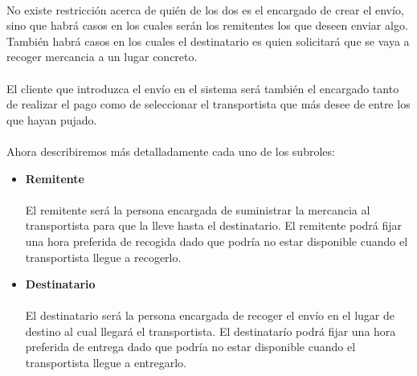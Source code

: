 \documentclass[10pt, a4paper,spanish]{article}
\begin{document}
\begin{itemize}
			\paragraph{}
			No existe restricción acerca de quién de los dos es el encargado de crear el envío, sino que habrá casos en los cuales serán los remitentes los que deseen enviar algo. También habrá casos en los cuales el destinatario es quien solicitará que se vaya a recoger mercancia a un lugar concreto.

			\paragraph{}
			El cliente que introduzca el envío en el sistema será también el encargado tanto de realizar el pago como de seleccionar el transportista que más desee de entre los que hayan pujado.

			\paragraph{}
			Ahora describiremos más detalladamente cada uno de los subroles:

			\begin{itemize}

				\item{\textbf{Remitente}}
				\paragraph{}
				El remitente será la persona encargada de suministrar la mercancia al transportista para que la lleve hasta el destinatario. El remitente podrá fijar una hora preferida de recogida dado que podría no estar disponible cuando el transportista llegue a recogerlo.

				\item{\textbf{Destinatario}}
				\paragraph{}
				El destinatario será la persona encargada de recoger el envío en el lugar de destino al cual llegará el transportista. El destinatarío podrá fijar una hora preferida de entrega dado que podría no estar disponible cuando el transportista llegue a entregarlo.

			\end{itemize}





		\end{itemize}
\end{document}
